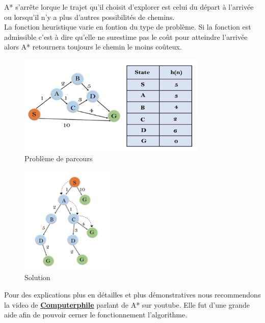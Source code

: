\documentclass[12pt]{article}
\begin{document}
	A* s'arrête lorque le trajet qu'il choisit d'explorer est celui du départ à l'arrivée ou lorsqu'il n'y a plus d'autres possibilités de chemins.\\
	La fonction heuristique varie en fontion du type de problème. Si la fonction est admissible c'est à dire qu'elle ne surestime pas le coût pour 
	atteindre l'arrivée alors A* retournera toujours le chemin le moins coûteux.
	\begin{figure}[h!]
		\centering
		\includegraphics[width = 0.8\textwidth]{Images/aStar.png}
		\caption{Problème de parcours}
	\end{figure}	
	
	\newpage
	\begin{figure}[h!]
		\centering
		\includegraphics[width = 0.4\textwidth]{Images/solution.png}
		\caption{Solution}
	\end{figure}

	Pour des explications plus en détailles et plus démonstratives nous recommendons la video de 
	\href{https://www.youtube.com/watch?v=ySN5Wnu88nE}{\textbf{Computerphile}} parlant de A* sur youtube. Elle fut d'une grande aide afin de 
	pouvoir cerner le fonctionnement l'algorithme.
	\newpage
\end{document}
